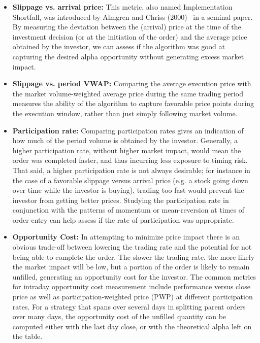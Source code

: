 \begin{itemize}
\item \textbf{Slippage vs. arrival price:} This metric, also named Implementation Shortfall, was introduced by Almgren and Chriss (2000)~\cite{alm2000} in a seminal paper. By measuring the deviation between the (arrival) price at the time of the investment decision (or at the initiation of the order) and the average price obtained by the investor, we can assess if the algorithm was good at capturing the desired alpha opportunity without generating excess market impact. 

\item \textbf{Slippage vs. period VWAP:} Comparing the average execution price with the market volume-weighted average price during the same trading period measures the ability of the algorithm to capture favorable price points during the execution window, rather than just simply following market volume.  

\item \textbf{Participation rate:} Comparing participation rates gives an indication of how much of the period volume is obtained by the investor. Generally, a higher participation rate, without higher market impact, would mean the order was completed faster, and thus incurring less exposure to timing risk. That said, a higher participation rate is not always desirable; for instance in the case of a favorable slippage versus arrival price (e.g. a stock going down over time while the investor is buying), trading too fast would prevent the investor from getting better prices. Studying the participation rate in conjunction with the patterns of momentum or mean-reversion at times of order entry can help assess if the rate of participation was appropriate.

\item \textbf{Opportunity Cost:} In attempting to minimize price impact there is an obvious trade-off between lowering the trading rate and the potential for not being able to complete the order. The slower the trading rate, the more likely the market impact will be low, but a portion of the order is likely to remain unfilled, generating an opportunity cost for the investor. The common metrics for intraday opportunity cost measurement include performance versus close price as well as participation-weighted price (PWP) at different participation rates. For a strategy that spans over several days in splitting parent orders over many days, the opportunity cost of the unfilled quantity can be computed either with the last day close, or with the theoretical alpha left on the table.


\end{itemize}
